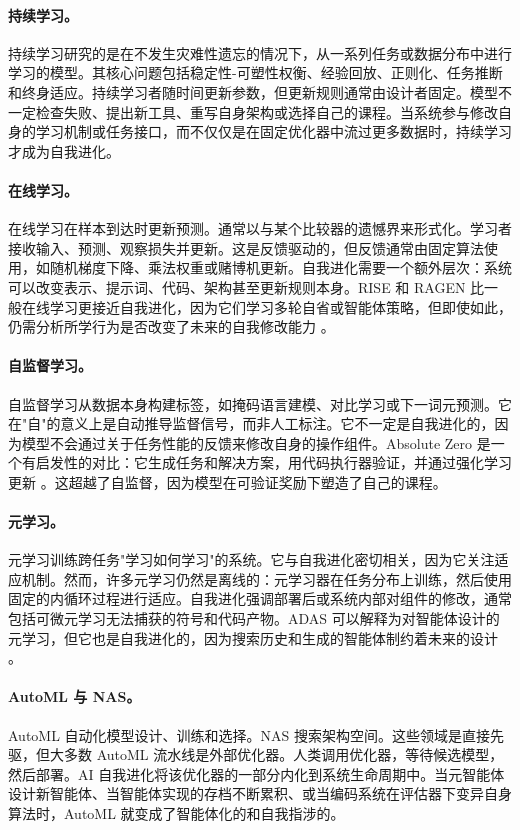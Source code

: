 \paragraph{持续学习。} 持续学习研究的是在不发生灾难性遗忘的情况下，从一系列任务或数据分布中进行学习的模型。其核心问题包括稳定性-可塑性权衡、经验回放、正则化、任务推断和终身适应。持续学习者随时间更新参数，但更新规则通常由设计者固定。模型不一定检查失败、提出新工具、重写自身架构或选择自己的课程。当系统参与修改自身的学习机制或任务接口，而不仅仅是在固定优化器中流过更多数据时，持续学习才成为自我进化。

\paragraph{在线学习。} 在线学习在样本到达时更新预测。通常以与某个比较器的遗憾界来形式化。学习者接收输入、预测、观察损失并更新。这是反馈驱动的，但反馈通常由固定算法使用，如随机梯度下降、乘法权重或赌博机更新。自我进化需要一个额外层次：系统可以改变表示、提示词、代码、架构甚至更新规则本身。RISE 和 RAGEN 比一般在线学习更接近自我进化，因为它们学习多轮自省或智能体策略，但即使如此，仍需分析所学行为是否改变了未来的自我修改能力 \cite{qu2024rise,wang2025ragen}。

\paragraph{自监督学习。} 自监督学习从数据本身构建标签，如掩码语言建模、对比学习或下一词元预测。它在"自"的意义上是自动推导监督信号，而非人工标注。它不一定是自我进化的，因为模型不会通过关于任务性能的反馈来修改自身的操作组件。Absolute Zero 是一个有启发性的对比：它生成任务和解决方案，用代码执行器验证，并通过强化学习更新 \cite{absolutezero2025}。这超越了自监督，因为模型在可验证奖励下塑造了自己的课程。

\paragraph{元学习。} 元学习训练跨任务"学习如何学习"的系统。它与自我进化密切相关，因为它关注适应机制。然而，许多元学习仍然是离线的：元学习器在任务分布上训练，然后使用固定的内循环过程进行适应。自我进化强调部署后或系统内部对组件的修改，通常包括可微元学习无法捕获的符号和代码产物。ADAS 可以解释为对智能体设计的元学习，但它也是自我进化的，因为搜索历史和生成的智能体制约着未来的设计 \cite{adas2025}。

\paragraph{AutoML 与 NAS。} AutoML 自动化模型设计、训练和选择。NAS 搜索架构空间。这些领域是直接先驱，但大多数 AutoML 流水线是外部优化器。人类调用优化器，等待候选模型，然后部署。AI 自我进化将该优化器的一部分内化到系统生命周期中。当元智能体设计新智能体、当智能体实现的存档不断累积、或当编码系统在评估器下变异自身算法时，AutoML 就变成了智能体化的和自我指涉的。

